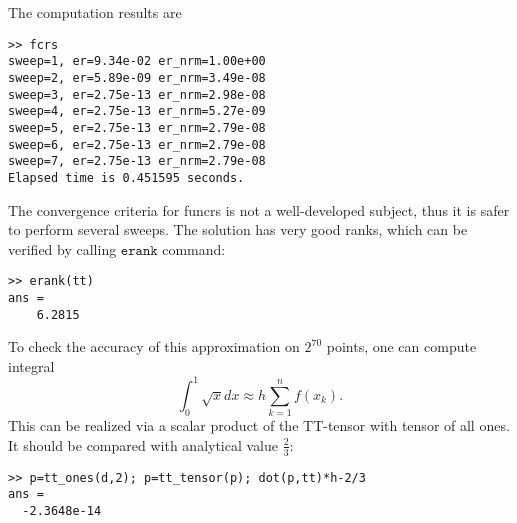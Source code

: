 \documentclass[a4paper,12pt,twoside]{article}
\begin{document}
The computation results are
\begin{lstlisting}
>> fcrs
sweep=1, er=9.34e-02 er_nrm=1.00e+00 
sweep=2, er=5.89e-09 er_nrm=3.49e-08 
sweep=3, er=2.75e-13 er_nrm=2.98e-08 
sweep=4, er=2.75e-13 er_nrm=5.27e-09 
sweep=5, er=2.75e-13 er_nrm=2.79e-08 
sweep=6, er=2.75e-13 er_nrm=2.79e-08 
sweep=7, er=2.75e-13 er_nrm=2.79e-08 
Elapsed time is 0.451595 seconds.
\end{lstlisting}
The convergence criteria for funcrs is not a well-developed subject, thus it is safer to perform 
several sweeps.
The solution has very good ranks, which can be verified by calling $\texttt{erank}$ command:
\begin{lstlisting}
>> erank(tt)
ans =
    6.2815
\end{lstlisting}
To check the accuracy of this approximation on $2^{70}$ points, one can compute integral
$$\int_{0}^1 \sqrt{x} dx \approx h \sum_{k=1}^n f(x_k).$$
This can be realized via a scalar product of the TT-tensor with tensor of all ones.
It should be compared with analytical value $\frac{2}{3}$:
\begin{lstlisting}
>> p=tt_ones(d,2); p=tt_tensor(p); dot(p,tt)*h-2/3
ans =
  -2.3648e-14
\end{lstlisting}

%
\end{document}
